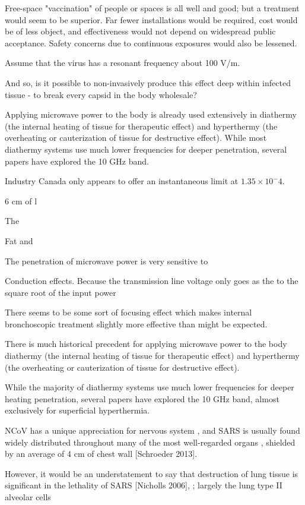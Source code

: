 \documentclass[paper.tex]{subfiles}
\begin{document}
Free-space "vaccination" of people or spaces is all well and good; but a treatment would seem to be superior. Far fewer installations would be required, cost would be of less object, and effectiveness would not depend on widespread public acceptance. Safety concerns due to continuous exposures would also be lessened.

Assume that the virus has a resonant frequency about 100 V/m. 

And so, is it possible to non-invasively produce this effect deep within infected tissue - to break every capsid in the body wholesale?
 
 
 Applying microwave power to the body is already used extensively in diathermy (the internal heating of tissue for therapeutic effect) and hyperthermy (the overheating or cauterization of tissue for destructive effect). While most diathermy systems use much lower frequencies for deeper penetration, several papers have explored the 10 GHz band. 
 
 Industry Canada only appears to offer an instantaneous limit at $1.35 \times 10^-4$.
 
 6 cm of l
 
 The 
 
 Fat and 
 
 The penetration of microwave power is very sensitive to 
 
 Conduction effects. Because the transmission line voltage only goes as the to the square root of the input power
 
 There seems to be some sort of focusing effect which makes internal bronchoscopic treatment slightly more effective than might be expected.
 
 
There is much historical precedent for applying microwave power to the body diathermy (the internal heating of tissue for therapeutic effect) and hyperthermy (the overheating or cauterization of tissue for destructive effect). 

While the majority of diathermy systems use much lower frequencies for deeper heating penetration, several papers have explored the 10 GHz band, almost exclusively for superficial hyperthermia.

NCoV has a unique appreciation for nervous system \cite{neuroinvasive2020}, and SARS is usually found widely distributed throughout many of the most well-regarded organs \cite{Organ2004}, shielded by an average of 4 cm of chest wall [Schroeder 2013]. 

However, it would be an understatement to say that destruction of lung tissue is significant in the lethality of SARS [Nicholls 2006], \cite{situ2020}; largely the lung type II alveolar cells 
\end{document}
